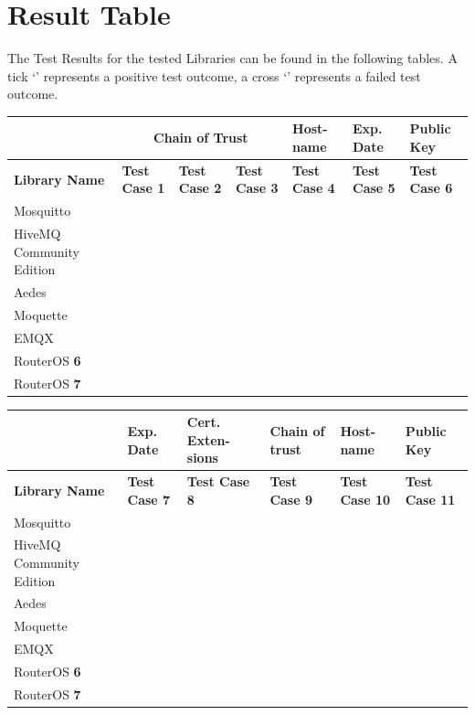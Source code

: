 \documentclass[binding=0.6cm,noexaminfo]{sapthesis}
\newcommand{\cmark}{\ding{51}}%
\newcommand{\xmark}{\ding{55}}%
\begin{document}
\newpage
\section{Result Table}
The Test Results for the tested Libraries can be found in the following tables. A tick `\cmark' represents a positive test outcome, a cross `\xmark' represents a failed test outcome.

\begin{flushleft}
\begin{tabular}{| p{2cm} | p{1.5cm} | p{1.5cm} | p{1.5cm} | p{1.5cm} | p{1.5cm} | p{1.5cm} |}
\hline
 & \multicolumn{3}{|c|}{\bf Chain of Trust} & \bf Host- name & \bf Exp. Date & \bf Public Key \\
\hline
\bf Library Name & \bf Test Case 1 & \bf Test Case 2 & \bf Test Case 3 & \bf Test Case 4 & \bf Test Case 5 & \bf Test Case 6 \\
\hline
Mosquitto & \cmark & \cmark & \cmark & \cmark & \cmark & \cmark  \\
\hline
HiveMQ Community Edition & \cmark & \cmark & \cmark & \cmark & \cmark & \cmark  \\
\hline
Aedes & \cmark & \cmark & \cmark & \cmark & \cmark & \cmark  \\
\hline
Moquette & \cmark & \cmark & \cmark & \cmark & \cmark & \cmark  \\
\hline
EMQX & \cmark & \cmark & \cmark & \cmark & \cmark & \cmark  \\
\hline
RouterOS \textbf{6} & \cmark & \cmark & \cmark & \cmark & \cmark & \cmark  \\
\hline
RouterOS \textbf{7} & \cmark & \cmark & \cmark & \cmark & \cmark & \cmark  \\
\hline
\end{tabular}
\end{flushleft}

\begin{flushleft}
\begin{tabular}{| p{2cm} | p{1.5cm} | p{1.5cm} | p{1.5cm} | p{1.5cm} | p{1.5cm} |}
\hline
 & \bf Exp. Date & \bf Cert. Exten- sions & \bf Chain of trust & \bf Host- name & \bf Public Key \\
\hline
\bf Library Name & \bf Test Case 7 & \bf Test Case 8 & \bf Test Case 9 & \bf Test Case 10 & \bf Test Case 11 \\
\hline
Mosquitto & \cmark & \cmark & \cmark & \cmark & \cmark \\
\hline
HiveMQ Community Edition & \cmark & \cmark & \cmark & \cmark & \cmark \\
\hline
Aedes & \cmark & \cmark & \cmark & \cmark & \cmark \\
\hline
Moquette & \cmark & \cmark & \cmark & \cmark & \cmark \\
\hline
EMQX & \cmark & \cmark & \cmark & \cmark & \cmark \\
\hline
RouterOS \textbf{6} & \cmark & \cmark & \cmark & \cmark & \cmark \\
\hline
RouterOS \textbf{7} & \cmark & \xmark & \cmark & \cmark & \cmark \\
\hline
\end{tabular}
\end{flushleft}
\end{document}
